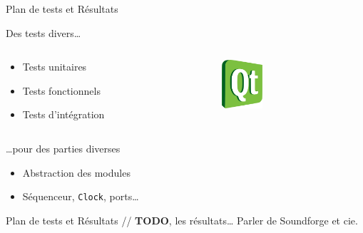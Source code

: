 \documentclass[frenchb]{beamer}
\begin{document}
\begin{frame}{Plan de tests et Résultats}
    \begin{block}{Des tests divers…}
        \begin{columns}
            \begin{column}[l]{5cm}
                \begin{itemize}
                    \item Tests unitaires
                    \item Tests fonctionnels
                    \item Tests d'intégration
                \end{itemize}
            \end{column}
            \begin{column}[r]{5cm}
                \begin{center}
                    \includegraphics[width=1.5cm]{../img/ps/Qt.pdf}
                \end{center}
            \end{column}
        \end{columns}
    \end{block}

    \vspace{0.7cm}

    \begin{block}{\centering …pour des parties diverses}
        \begin{itemize}
            \item Abstraction des modules
            \item Séquenceur, \texttt{Clock}, ports…
        \end{itemize}
    \end{block}
\end{frame}

\begin{frame}{Plan de tests et Résultats}
  // \textbf{TODO}, les résultats… Parler de Soundforge et cie.
\end{frame}
\end{document}
